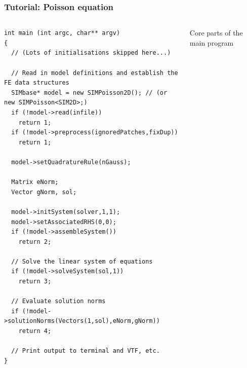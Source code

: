 \documentclass{beamer}
\begin{document}
\begin{frame}[fragile] %
 \frametitle{Tutorial: Poisson equation}

 \begin{columns}[c]
  \tiny\begin{verbatim}
int main (int argc, char** argv)
{
  // (Lots of initialisations skipped here...)

  // Read in model definitions and establish the FE data structures
  SIMbase* model = new SIMPoisson2D(); // (or new SIMPoisson<SIM2D>;)
  if (!model->read(infile))
    return 1;
  if (!model->preprocess(ignoredPatches,fixDup))
    return 1;

  model->setQuadratureRule(nGauss);

  Matrix eNorm;
  Vector gNorm, sol;

  model->initSystem(solver,1,1);
  model->setAssociatedRHS(0,0);
  if (!model->assembleSystem())
    return 2;

  // Solve the linear system of equations
  if (!model->solveSystem(sol,1))
    return 3;

  // Evaluate solution norms
  if (!model->solutionNorms(Vectors(1,sol),eNorm,gNorm))
    return 4;

  // Print output to terminal and VTF, etc.
}
  \end{verbatim}
  \small
  Core parts of the main program
 \end{columns}
\end{frame}
\end{document}
